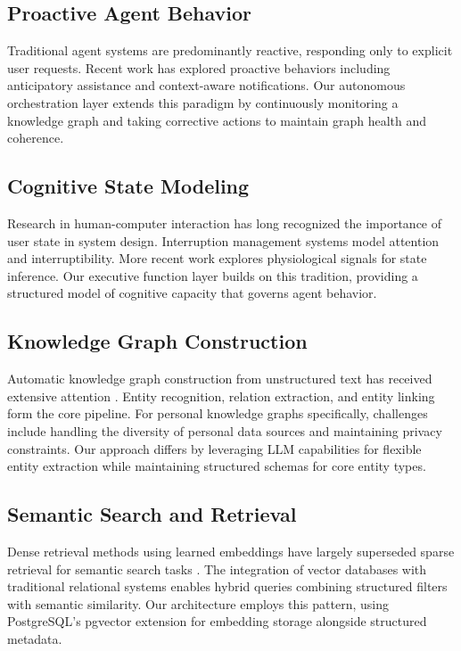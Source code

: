 \documentclass[11pt,a4paper]{article}
\begin{document}
\subsection{Proactive Agent Behavior}

Traditional agent systems are predominantly reactive, responding only to explicit user requests. Recent work has explored proactive behaviors including anticipatory assistance \citep{yorke2012proactive} and context-aware notifications. Our autonomous orchestration layer extends this paradigm by continuously monitoring a knowledge graph and taking corrective actions to maintain graph health and coherence.

\subsection{Cognitive State Modeling}

Research in human-computer interaction has long recognized the importance of user state in system design. Interruption management systems \citep{horvitz1999principles} model attention and interruptibility. More recent work explores physiological signals for state inference. Our executive function layer builds on this tradition, providing a structured model of cognitive capacity that governs agent behavior.

\subsection{Knowledge Graph Construction}

Automatic knowledge graph construction from unstructured text has received extensive attention \citep{nickel2016review}. Entity recognition, relation extraction, and entity linking form the core pipeline. For personal knowledge graphs specifically, challenges include handling the diversity of personal data sources and maintaining privacy constraints. Our approach differs by leveraging LLM capabilities for flexible entity extraction while maintaining structured schemas for core entity types.

\subsection{Semantic Search and Retrieval}

Dense retrieval methods using learned embeddings have largely superseded sparse retrieval for semantic search tasks \citep{karpukhin2020dense}. The integration of vector databases with traditional relational systems enables hybrid queries combining structured filters with semantic similarity. Our architecture employs this pattern, using PostgreSQL's pgvector extension for embedding storage alongside structured metadata.
\end{document}
